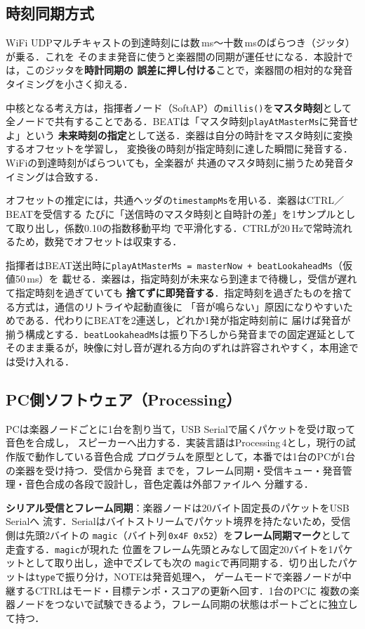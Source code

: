 \documentclass[lualatex,book,paper=a4paper,jafontsize=11.5pt,jafontscale=1.05]{jlreq}
\begin{document}
\subsection{時刻同期方式}
WiFi UDPマルチキャストの到達時刻には数\,ms〜十数\,msのばらつき（ジッタ）が乗る．これを
そのまま発音に使うと楽器間の同期が運任せになる．本設計では，このジッタを\textbf{時計同期の
誤差に押し付ける}ことで，楽器間の相対的な発音タイミングを小さく抑える．

中核となる考え方は，指揮者ノード（SoftAP）の\texttt{millis()}を\textbf{マスタ時刻}として
全ノードで共有することである．BEATは「マスタ時刻\texttt{playAtMasterMs}に発音せよ」という
\textbf{未来時刻の指定}として送る．楽器は自分の時計をマスタ時刻に変換するオフセットを学習し，
変換後の時刻が指定時刻に達した瞬間に発音する．WiFiの到達時刻がばらついても，全楽器が
共通のマスタ時刻に揃うため発音タイミングは合致する．

オフセットの推定には，共通ヘッダの\texttt{timestampMs}を用いる．楽器はCTRL／BEATを受信する
たびに「送信時のマスタ時刻と自時計の差」を1サンプルとして取り出し，係数0.10の指数移動平均
で平滑化する．CTRLが20\,Hzで常時流れるため，数発でオフセットは収束する．

指揮者はBEAT送出時に\texttt{playAtMasterMs = masterNow + beatLookaheadMs}（仮値50\,ms）を
載せる．楽器は，指定時刻が未来なら到達まで待機し，受信が遅れて指定時刻を過ぎていても
\textbf{捨てずに即発音する}．指定時刻を過ぎたものを捨てる方式は，通信のリトライや起動直後に
「音が鳴らない」原因になりやすいためである．代わりにBEATを2連送し，どれか1発が指定時刻前に
届けば発音が揃う構成とする．\texttt{beatLookaheadMs}は振り下ろしから発音までの固定遅延として
そのまま乗るが，映像に対し音が遅れる方向のずれは許容されやすく，本用途では受け入れる．

\subsection{PC側ソフトウェア（Processing）}\label{sec:pc-software}
PCは楽器ノードごとに1台を割り当て，USB Serialで届くパケットを受け取って音色を合成し，
スピーカーへ出力する．実装言語はProcessing\,4とし，現行の試作版で動作している音色合成
プログラムを原型として，本番では1台のPCが1台の楽器を受け持つ．受信から発音
までを，フレーム同期・受信キュー・発音管理・音色合成の各段で設計し，音色定義は外部ファイルへ
分離する．

\textbf{シリアル受信とフレーム同期}：楽器ノードは20バイト固定長のパケットをUSB Serialへ
流す．Serialはバイトストリームでパケット境界を持たないため，受信側は先頭2バイトの
\texttt{magic}（バイト列\,\texttt{0x4F 0x52}）を\textbf{フレーム同期マーク}として走査する．\texttt{magic}が現れた
位置をフレーム先頭とみなして固定20バイトを1パケットとして取り出し，途中でズレても次の
\texttt{magic}で再同期する．切り出したパケットは\texttt{type}で振り分け，NOTEは発音処理へ，
ゲームモードで楽器ノードが中継するCTRLはモード・目標テンポ・スコアの更新へ回す．1台のPCに
複数の楽器ノードをつないで試験できるよう，フレーム同期の状態はポートごとに独立して持つ．
\end{document}
